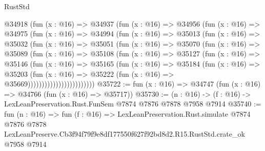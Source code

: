 \begin{lexlean}{RustStd}
\begin{coremodule}
                @34918
                  (fun (x : @16) =>
                  @34937
                    (fun (x : @16) =>
                    @34956
                      (fun (x : @16) =>
                      @34975
                        (fun (x : @16) =>
                        @34994
                          (fun (x : @16) =>
                          @35013
                            (fun (x : @16) =>
                            @35032
                              (fun (x : @16) =>
                              @35051
                                (fun (x : @16) =>
                                @35070
                                  (fun (x : @16) =>
                                  @35089
                                    (fun (x : @16) =>
                                    @35108
                                      (fun (x : @16) =>
                                      @35127
                                        (fun (x : @16) =>
                                        @35146
                                          (fun (x : @16) =>
                                          @35165
                                            (fun (x : @16) =>
                                            @35184
                                              (fun (x : @16) =>
                                              @35203
                                                (fun (x : @16) =>
                                                @35222
                                                  (fun (x : @16) => @35669))))))))))))))))))))))))
@35722 := fun (x : @16) => @34747 (fun (x : @16) => @34766 (fun (x : @16) => @35717))
@35730 := (n : @16) -> (f : @16) -> LexLeanPreservation.Rust.FunSem @7874 @7876 @7878 @7958 @7914
@35740 := fun (n : @16) =>
  fun (f : @16) =>
  LexLeanPreservation.Rust.simulate
    @7874
    @7876
    @7878
    LexLeanPreserve.Cb3f94f79f9e8df177550f627f92bd8d2.R15.RustStd.crate_ok
    @7958
    @7914
\end{coremodule}
\end{lexlean}
